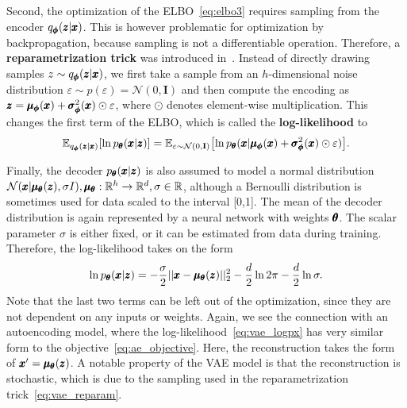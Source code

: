 Second, the optimization of the ELBO~\eqref{eq:elbo3} requires sampling from the encoder $q_{\pmb{{\phi}}}(\pmb{{z}}|\pmb{{x}})$. This is however problematic for optimization by backpropagation, because sampling is not a differentiable operation. Therefore, a \textbf{reparametrization trick} was introduced in~\cite{kingma2013vae}. Instead of directly drawing samples $z \sim q_{\pmb{{\phi}}}(\pmb{{z}}|\pmb{{x}})$, we first take a sample from an $h$-dimensional noise distribution $\varepsilon\sim p(\varepsilon)=\mathcal{N}(0,\mathbf{I})$ and then compute the encoding as $\pmb{{z}}=\pmb{{\mu}}_{\pmb{{\phi}}}(\pmb{{x}})+\pmb{{\sigma}}^2_{\pmb{{\phi}}}(\pmb{{x}}) \odot \varepsilon$, where $\odot$ denotes element-wise multiplication. This changes the first term of the ELBO, which is called the \textbf{log-likelihood} to
\begin{equation} \label{eq:vae_reparam}
\mathbb{E}_{q_{\vc{\phi}}(\vc{z}|\vc{x})}\left[\ln p_{\vc{\theta}}(\vc{x}|\vc{z})\right] = \mathbb{E}_{\varepsilon\sim\mathcal{N}(0,\textbf{I})}\left[\ln p_{\vc{\theta}}(\vc{x}| \vc{\mu}_{\vc{\phi}}(\vc{x})+\vc{\sigma}^2_{\vc{\phi}}(\vc{x}) \odot \varepsilon )\right].
\end{equation}

Finally, the decoder $p_{\pmb{{\theta}}}(\pmb{{x}}|\pmb{{z}})$ is also assumed to model a normal distribution\\ $\mathcal{N}(\pmb{{x}}|\pmb{{\mu}}_{\pmb{{\theta}}}(\pmb{{z}}),\sigma I), \pmb{{\mu}}_{\pmb{{\theta}}} :\mathbb{R}^h \rightarrow \mathbb{R}^d, \sigma\in\mathbb{R}$, although a Bernoulli distribution is sometimes used for data scaled to the interval [0,1]. The mean of the decoder distribution is again represented by a neural network with weights $\pmb{{\theta}}$. The scalar parameter $\sigma$ is either fixed, or it can be estimated from data during training. Therefore, the log-likelihood takes on the form 
\begin{equation} \label{eq:vae_logpx}
\ln p_{\pmb{{\theta}}}(\pmb{{x}}|\pmb{{z}}) = - \frac{\sigma}{2} \vert \vert \pmb{{x}} - \pmb{{\mu}}_{\pmb{{\theta}}}(\pmb{{z}}) \vert \vert_2^2 - \frac{d}{2} \ln 2\pi - \frac{d}{2} \ln \sigma. 
\end{equation}
Note that the last two terms can be left out of the optimization, since they are not dependent on any inputs or weights. Again, we see the connection with an autoencoding model, where the log-likelihood~\eqref{eq:vae_logpx} has very similar form to the objective~\eqref{eq:ae_objective}. Here, the reconstruction takes the form of $\pmb{{x}}' = \pmb{{\mu}}_{\pmb{{\theta}}}(\pmb{{z}})$. A notable property of the VAE model is that the reconstruction is stochastic, which is due to the sampling used in the reparametrization trick~\eqref{eq:vae_reparam}. 

